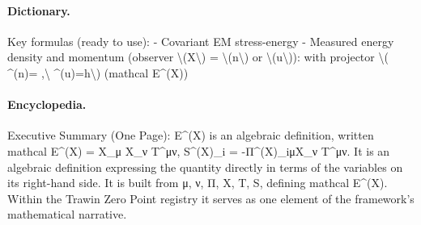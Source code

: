 \paragraph{Dictionary.}
Key formulas (ready to use): - Covariant EM stress-energy - Measured energy density and momentum (observer \textbackslash{}(X\textbackslash{}) = \textbackslash{}(n\textbackslash{}) or \textbackslash{}(u\textbackslash{})): with projector \textbackslash{}( \textasciicircum{}(n)= ,\textbackslash{} \textasciicircum{}(u)=h\textbackslash{}) (mathcal E\textasciicircum{}(X))

\paragraph{Encyclopedia.}
Executive Summary (One Page): E\textasciicircum{}(X) is an algebraic definition, written mathcal E\textasciicircum{}(X) = X\_μ X\_ν T\textasciicircum{}μν, S\textasciicircum{}(X)\_i = -Π\textasciicircum{}(X)\_iμX\_ν T\textasciicircum{}μν. It is an algebraic definition expressing the quantity directly in terms of the variables on its right-hand side. It is built from μ, ν, Π, X, T, S, defining mathcal E\textasciicircum{}(X). Within the Trawin Zero Point registry it serves as one element of the framework's mathematical narrative.
